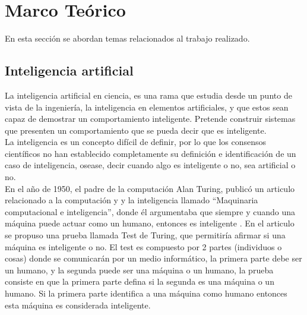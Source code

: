 \documentclass[twoside,spanish,ESP,MSc]{plantillaLabUPV}
\theoremstyle{definition}
\begin{document}
 


\chapter{Marco Teórico} \label{chap:marcoteori} 

En esta sección se abordan temas relacionados al trabajo realizado.




\section{Inteligencia artificial}

La inteligencia artificial en ciencia, es una rama que estudia desde un punto de vista de la ingeniería, la inteligencia en elementos artificiales, y que estos sean capaz de demostrar un comportamiento inteligente. Pretende construir sistemas que presenten un comportamiento que se pueda decir que es inteligente.\\


La inteligencia es un concepto difícil de definir, por lo que los consensos científicos no han establecido completamente su definición e identificación de un caso de inteligencia, osease, decir cuando algo es inteligente o no, sea artificial o no.\\

En el año de 1950, el padre de la computación Alan Turing, publicó un articulo relacionado a la computación y y la inteligencia llamado ``Maquinaria computacional e inteligencia'', donde él argumentaba que siempre y cuando una máquina puede actuar como un humano, entonces es inteligente \cite{iabook}. En el articulo se propuso una prueba llamada Test de Turing, que permitiría afirmar si una máquina es inteligente o no. El test es compuesto por 2 partes (individuos o cosas) donde se comunicarán por un medio informático, la primera parte debe ser un humano, y la segunda puede ser una máquina o un humano, la prueba consiste en que la primera parte defina si la segunda es una máquina o un humano. Si la primera parte identifica a una máquina como humano entonces esta máquina es considerada inteligente.\\
\end{document}
